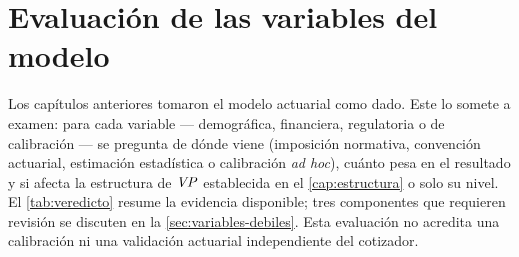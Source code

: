 \chapter{Evaluación de las variables del modelo}
\label{cap:variables}

Los capítulos anteriores tomaron el modelo actuarial como dado. Este lo somete a
examen: para cada variable --- demográfica, financiera, regulatoria o de
calibración --- se pregunta de dónde viene (imposición normativa, convención
actuarial, estimación estadística o calibración \emph{ad hoc}), cuánto pesa en el
resultado y si afecta la estructura de $\mathit{VP}$ establecida en el
\cref{cap:estructura} o solo su nivel. El \cref{tab:veredicto} resume la evidencia
disponible; tres componentes que requieren revisión se discuten en la
\cref{sec:variables-debiles}. Esta evaluación no acredita una calibración ni una
validación actuarial independiente del cotizador.

